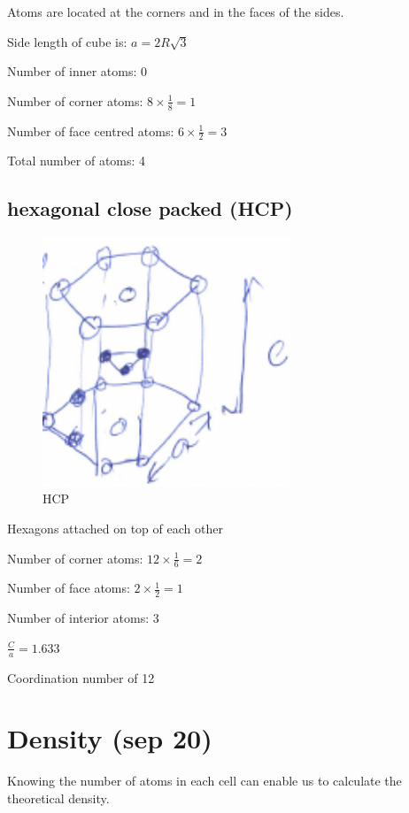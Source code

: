 \documentclass{article}
\begin{document}
Atoms are located at the corners and in the faces of the sides.

Side length of cube is: $a = 2R\sqrt{3}$

Number of inner atoms: 0

Number of corner atoms: $8\times\frac{1}{8} = 1$

Number of face centred atoms: $6\times\frac{1}{2}=3$

Total number of atoms: 4

\subsection{hexagonal close packed (HCP)}

\begin{figure}[H]
	\centering
	\includegraphics[width=0.66\textwidth]{assets/26287451.png}
	\caption{HCP}
\end{figure}

Hexagons attached on top of each other

Number of corner atoms: $12 \times \frac{1}{6} = 2$

Number of face atoms: $2\times \frac{1}{2} = 1$

Number of interior atoms: 3

$\frac{C}{a} = 1.633$

Coordination number of 12

\section{Density (sep 20)}

Knowing the number of atoms in each cell can enable us to calculate the theoretical density.
\end{document}

